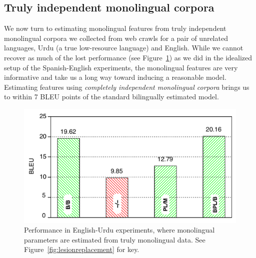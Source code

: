 \documentclass[11pt]{article}
\newcommand{\figref}[1]{Figure~\ref{#1}}
\begin{document}
\subsection{Truly independent monolingual corpora} \label{sect:exp:indep}

We now turn to estimating monolingual features from truly independent monolingual corpora we collected from web crawls for a pair of unrelated languages, Urdu (a true low-resource language) and English.  While we cannot recover as much of the lost performance (see \figref{fig:urdu}) as we did in the idealized setup of the Spanish-English experiments, the monolingual features are very informative and take us a long way toward inducing a reasonable model.  Estimating features using \emph{completely independent monolingual corpora} brings us to within 7 BLEU points of the standard bilingually estimated model. %

\begin{figure}[t]
\vskip -0.11in
\includegraphics[width=\linewidth]{../figures/urdu/urdulegendanni.pdf}
\caption{Performance in English-Urdu experiments, where monolingual parameters are estimated from truly  monolingual data. See \figref{fig:lesionreplacement} for key.}
\label{fig:urdu}
\end{figure}


\end{document}
